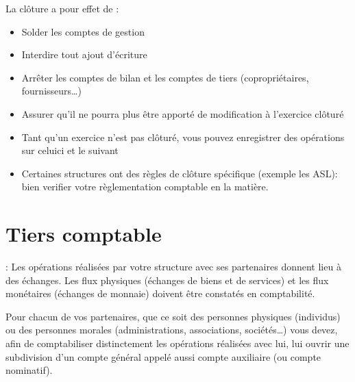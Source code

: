 \documentclass[a4paper,10pt,oneside,french]{sphinxmanual}
\begin{document}
\sphinxAtStartPar
La clôture a pour effet de :
\begin{itemize}
\item {} 
\sphinxAtStartPar
Solder les comptes de gestion

\item {} 
\sphinxAtStartPar
Interdire tout ajout d’écriture

\item {} 
\sphinxAtStartPar
Arrêter les comptes de bilan et les comptes de tiers (copropriétaires, fournisseurs…)

\item {} 
\sphinxAtStartPar
Assurer qu’il ne pourra plus être apporté de modification à l’exercice clôturé

\end{itemize}

\sphinxAtStartPar
{}
\begin{itemize}
\item {} 
\sphinxAtStartPar
Tant qu’un exercice n’est pas clôturé, vous pouvez enregistrer des opérations sur celui\sphinxhyphen{}ci et le suivant

\item {} 
\sphinxAtStartPar
Certaines structures ont des règles de clôture spécifique (exemple les ASL): bien verifier votre règlementation comptable en la matière.

\end{itemize}

\sphinxstepscope


\section{Tiers comptable}
\label{\detokenize{accounting/third:tiers-comptable}}\label{\detokenize{accounting/third::doc}}
\sphinxAtStartPar
{} :
Les opérations réalisées par votre structure avec ses partenaires donnent lieu à des échanges. Les flux physiques (échanges de biens et de services) et les flux monétaires (échanges de monnaie) doivent être constatés en comptabilité.

\sphinxAtStartPar
Pour chacun de vos partenaires, que ce soit des personnes physiques (individus) ou des personnes morales (administrations, associations, sociétés…) vous devez, afin de comptabiliser distinctement les opérations réalisées avec lui, lui ouvrir une subdivision d’un compte général appelé aussi compte auxiliaire (ou compte nominatif).
\end{document}
